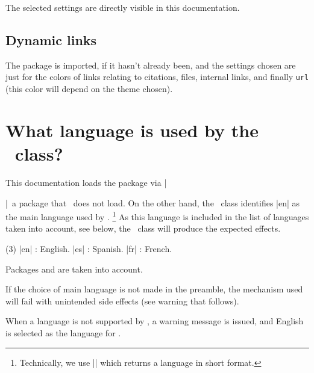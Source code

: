 The selected settings are directly visible in this documentation.


\subsection{Dynamic links}

The  package is imported, if it hasn't already been, and the settings chosen are just for the colors of links relating to citations, files, internal links, and finally \verb#url# (this color will depend on the theme chosen).


\section{What language is used by the \thisproj\ class?}

This documentation loads the  package via \tdoclatexin|\usepackage[english]{babel}|\, a package that \thisproj\ does not load.
On the other hand, the \thisproj\ class identifies \tdoclatexin|en| as the main language used by .%
\footnote{
    Technically, we use \tdoclatexin|| which returns a language in short format.
}
As this language is included in the list of languages taken into account, see below, the \thisproj\ class will produce the expected effects.

\begin{tasks}[label=\small\textbullet](3)
    \task \tdoclatexin|en| : English.
        \task \tdoclatexin|es| : Spanish.
        \task \tdoclatexin|fr| : French.
\end{tasks}
                    


\begin{tdocnote}
    Packages  and  are taken into account.
\end{tdocnote}


\begin{tdoccaut}
    If the choice of main language is not made in the preamble, the mechanism used will fail with unintended side effects (see warning that follows).
\end{tdoccaut}


\begin{tdocwarn}
    When a language is not supported by \thisproj, a warning message is issued, and English is selected as the language for \thisproj.
\end{tdocwarn}


